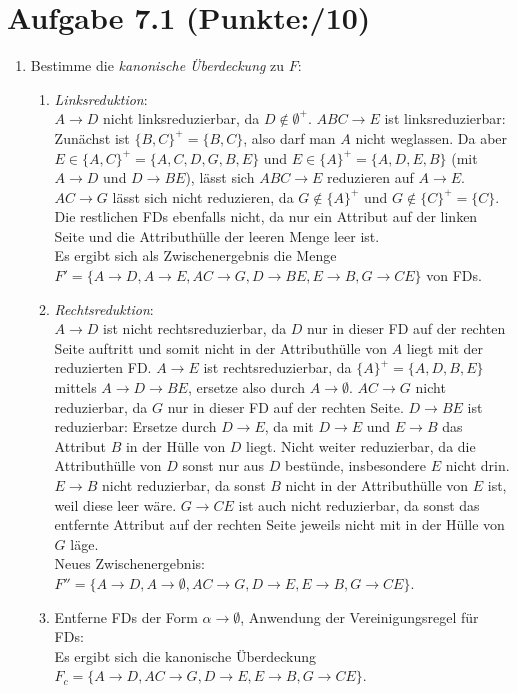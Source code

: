 \documentclass[11pt, a4paper]{article}
\newcommand{\blattnummer}{7}
\newcommand{\p}{10}
\newcommand{\aufgabe}[2] {\section*{Aufgabe \blattnummer.#1 (Punkte:\qquad/#2)}}
\begin{document}
\aufgabe{1}{\p}
\begin{enumerate}
\item Bestimme die \textit{kanonische Überdeckung} zu $F$:
\begin{enumerate}
\item \textit{Linksreduktion}:\\
$A \rightarrow D$ nicht linksreduzierbar, da $D \notin \emptyset^+$. $ABC \rightarrow E$ ist linksreduzierbar: Zunächst ist $\{ B,C\}^+=\{B,C\}$, also darf man $A$ nicht weglassen.
Da aber $E \in\{ A,C\}^+=\{ A,C,D,G,B,E\}$ und $E \in \{ A\}^+= \{ A,D,E,B\}$ (mit $A \rightarrow D$ und $D \rightarrow BE$), lässt sich $ABC \rightarrow E$ reduzieren auf $A
\rightarrow E$. $AC \rightarrow G$ lässt sich nicht reduzieren, da $G \notin \{ A\}^+$ und $G \notin \{ C\}^+=\{ C\}$. Die restlichen FDs ebenfalls nicht, da nur ein Attribut auf der linken
Seite und die Attributhülle der leeren Menge leer ist.\\
Es ergibt sich als Zwischenergebnis die Menge $F' = \{ A \rightarrow D, A \rightarrow E, AC \rightarrow G, D \rightarrow BE, E \rightarrow B, G \rightarrow CE\}$ von FDs.
\item \textit{Rechtsreduktion}:\\
$A \rightarrow D$ ist nicht rechtsreduzierbar, da $D$ nur in dieser FD auf der rechten Seite auftritt und somit nicht in der Attributhülle von $A$ liegt mit der reduzierten FD. $A \rightarrow E$
ist rechtsreduzierbar, da $\{ A\}^+= \{ A,D,B,E\}$ mittels $A \rightarrow D \rightarrow BE$, ersetze also durch $A \rightarrow \emptyset$. $AC \rightarrow G$ nicht reduzierbar, da $G$
nur in dieser FD auf der rechten Seite. $D \rightarrow BE$ ist reduzierbar: Ersetze durch $D \rightarrow E$, da mit $D\rightarrow E$ und $E \rightarrow B$ das Attribut $B$ in der Hülle von
$D$ liegt. Nicht weiter reduzierbar, da die Attributhülle von $D$ sonst nur aus $D$ bestünde, insbesondere $E$ nicht drin. $E \rightarrow B$ nicht reduzierbar, da sonst $B$ nicht in der
Attributhülle von $E$ ist, weil diese leer wäre. $G \rightarrow CE$ ist auch nicht reduzierbar, da sonst das entfernte Attribut auf der rechten Seite jeweils nicht mit in der Hülle von $G$ läge.\\
Neues Zwischenergebnis: $F''=\{ A \rightarrow D, A \rightarrow \emptyset, AC \rightarrow G, D \rightarrow E, E \rightarrow B, G \rightarrow CE\}$.
\item Entferne FDs der Form $\alpha \rightarrow \emptyset$, Anwendung der Vereinigungsregel für FDs:\\
Es ergibt sich die kanonische Überdeckung $F_c=\{ A \rightarrow D, AC \rightarrow G, D \rightarrow E, E \rightarrow B, G \rightarrow CE\}$.
\end{enumerate}


\end{enumerate}
\end{document}
